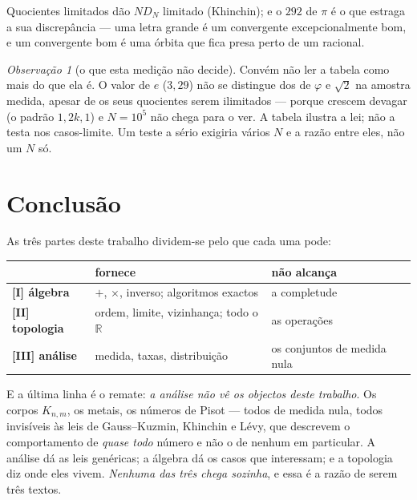 \documentclass[11pt,a4paper]{article}
\theoremstyle{plain}
\theoremstyle{definition}
\theoremstyle{remark}
\newtheorem{obs}[teorema]{Observação}
\newcommand{\R}{\mathbb{R}}
\begin{document}
\noindent Quocientes limitados dão $N D_N$ limitado (Khinchin); e o $292$ de $\pi$ é o que estraga a
sua discrepância --- uma letra grande é um convergente excepcionalmente bom, e um convergente bom é
uma órbita que fica presa perto de um racional.

\begin{obs}[o que esta medição não decide]\label{obs:naodecide}
Convém não ler a tabela como mais do que ela é. O valor de $e$ ($3{,}29$) não se distingue dos de
$\varphi$ e $\sqrt2$ na amostra medida, apesar de os seus quocientes serem ilimitados --- porque
crescem devagar (o padrão $1,2k,1$) e $N=10^5$ não chega para o ver. A tabela ilustra a lei; não a
testa nos casos-limite. Um teste a sério exigiria vários $N$ e a razão entre eles, não um $N$ só.
\end{obs}

\section{Conclusão}\label{sec:conc3}

As três partes deste trabalho dividem-se pelo que cada uma pode:

\begin{center}\small
\begin{tabular}{lll}
\hline
& fornece & não alcança \\ \hline
\textbf{[I] álgebra} & $+$, $\times$, inverso; algoritmos exactos & a completude \\
\textbf{[II] topologia} & ordem, limite, vizinhança; todo o $\R$ & as operações \\
\textbf{[III] análise} & medida, taxas, distribuição & os conjuntos de medida nula \\
\hline
\end{tabular}
\end{center}

\noindent E a última linha é o remate: \emph{a análise não vê os objectos deste trabalho}. Os
corpos $K_{n,m}$, os metais, os números de Pisot --- todos de medida nula, todos invisíveis às leis
de Gauss--Kuzmin, Khinchin e Lévy, que descrevem o comportamento de \emph{quase todo} número e não
o de nenhum em particular. A análise dá as leis genéricas; a álgebra dá os casos que interessam; e
a topologia diz onde eles vivem. \emph{Nenhuma das três chega sozinha}, e essa é a razão de serem
três textos.
\end{document}
